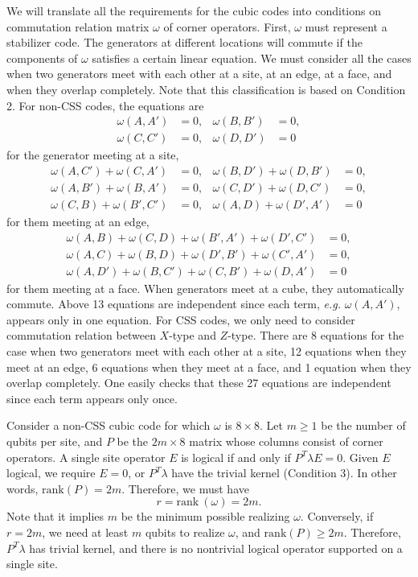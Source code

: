 \documentclass[letterpaper,10pt,pra,aps,showpacs,twocolumn]{revtex4-1}
\theoremstyle{definition} \newtheorem{defn}{Definition}
\theoremstyle{definition} \newtheorem{remark}{Remark}
\newcommand{\rank}{\mathrm{rank}}
\begin{document}
We will translate all the requirements for the cubic codes into conditions on commutation relation matrix $\omega$ of corner operators.
First, $\omega$ must represent a stabilizer code. The generators at different locations will commute if the components of $\omega$ satisfies a certain linear equation. We must consider all the cases when two generators meet with each other at a site, at an edge, at a face, and when they overlap completely. Note that this classification is based on Condition 2.
For non-CSS codes, the equations are
\begin{align*}
\omega(A,A')& = 0 , & \omega(B,B')& = 0 , \\
\omega(C,C')& = 0 , & \omega(D,D')& = 0 
\end{align*}
for the generator meeting at a site,
\begin{align*}
\omega(A,C') + \omega(C,A')& = 0 , & \omega(B,D') + \omega(D,B')& = 0 , \\
\omega(A,B') + \omega(B,A')& = 0 , & \omega(C,D') + \omega(D,C')& = 0 , \\
\omega(C,B) + \omega(B',C')& = 0 , & \omega(A,D) + \omega(D',A')& = 0 
\end{align*}
for them meeting at an edge,
\begin{align*}
\omega(A,B) + \omega(C,D) + \omega(B',A') + \omega(D',C')& = 0 , \\
\omega(A,C) + \omega(B,D) + \omega(D',B') + \omega(C',A')& = 0 , \\
\omega(A,D') + \omega(B,C') + \omega(C,B') + \omega(D,A')& = 0 
\end{align*}
for them meeting at a face. When generators meet at a cube, they automatically commute. Above 13 equations are independent since each term, \emph{e.g.} $\omega(A,A')$, appears only in one equation. For CSS codes, we only need to consider commutation relation between $X$-type and $Z$-type. There are 8 equations for the case when two generators meet with each other at a site, 12 equations when they meet at an edge, 6 equations when they meet at a face, and 1 equation when they overlap completely. One easily checks that these 27 equations are independent since each term appears only once.

Consider a non-CSS cubic code for which $\omega$ is $8 \times 8$. Let $m \geq 1$ be the number of qubits per site, and $P$ be the $2m \times 8$ matrix whose columns consist of corner operators. A single site operator $E$ is logical if and only if $P^T \lambda E = 0$. Given $E$ logical, we require $E = 0$, or $P^T \lambda$ have the trivial kernel (Condition 3). In other words, $\rank(P)=2m$. Therefore, we must have
\begin{equation}
 r = \rank ~ (\omega) = 2m .
\label{eq:no_single_site_logical_condition}
\end{equation}
Note that it implies $m$ be the minimum possible realizing $\omega$. Conversely, if $r=2m$, we need at least $m$ qubits to realize $\omega$, and $\rank(P) \geq 2m$. Therefore, $P^T \lambda$ has trivial kernel, and there is no nontrivial logical operator supported on a single site.
\end{document}
